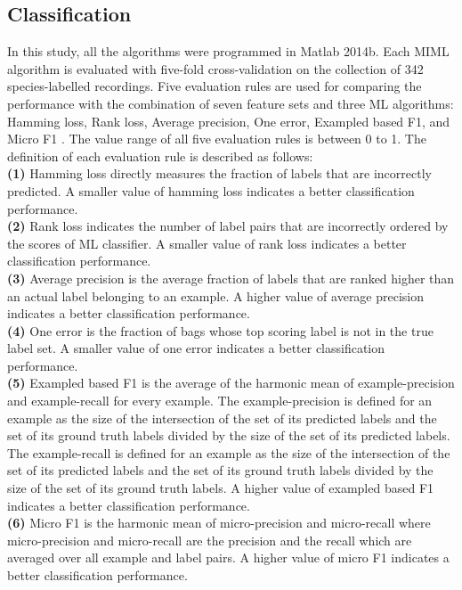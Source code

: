 \subsection{Classification}
In this study, all the algorithms were programmed in Matlab 2014b. Each MIML algorithm is evaluated with five-fold cross-validation on the collection of 342 species-labelled recordings. 
Five evaluation rules are used for comparing the performance with the combination of seven feature sets and three ML algorithms: Hamming loss, Rank loss, Average precision, One error, Exampled based F1, and Micro F1 \citep{Madjarov20123084, zhou2008miml}. The value range of all five evaluation rules is between 0 to 1. The definition of each evaluation rule is described as follows:
\\
\textbf{(1)} Hamming loss directly measures the fraction of labels that are incorrectly predicted. A smaller value of hamming loss indicates a better classification performance. 
\\
\textbf{(2)} Rank loss indicates the number of label pairs that are incorrectly ordered by the scores of ML classifier. A smaller value of rank loss indicates a better classification performance.
\\
\textbf{(3)} Average precision is the average fraction of labels that are ranked higher than an actual label belonging to an example. A higher value of average precision indicates a better classification performance.
\\
\textbf{(4)} One error is the fraction of bags whose top scoring label is not in the true label set. A smaller value of one error indicates a better classification performance.
\\
\textbf{(5)}
Exampled based F1 is the average of the harmonic mean of example-precision and example-recall for every example. The example-precision is defined for an example as the size of the intersection of the set of its predicted labels and the set of its ground truth labels divided by the size of the set of its predicted labels. The example-recall is defined for an example as the size of the intersection of the set of its predicted labels and the set of its ground truth labels divided by the size of the set of its ground truth labels. A higher value of exampled based F1 indicates a better classification performance.
\\
\textbf{(6)}
Micro F1 is the harmonic mean of micro-precision and micro-recall where micro-precision and micro-recall are the precision and the recall which are averaged over all example and label pairs. A higher value of micro F1 indicates a better classification performance.


